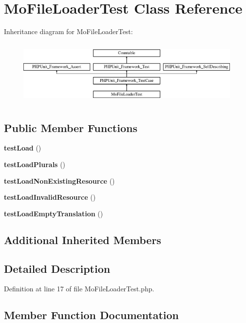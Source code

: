 \section{Mo\+File\+Loader\+Test Class Reference}
\label{class_symfony_1_1_component_1_1_translation_1_1_tests_1_1_loader_1_1_mo_file_loader_test}
Inheritance diagram for Mo\+File\+Loader\+Test\+:\begin{figure}[H]
\begin{center}
\leavevmode
\includegraphics[height=3.303835cm]{class_symfony_1_1_component_1_1_translation_1_1_tests_1_1_loader_1_1_mo_file_loader_test}
\end{center}
\end{figure}
\subsection*{Public Member Functions}
\begin{DoxyCompactItemize}
\item 
{\bf test\+Load} ()
\item 
{\bf test\+Load\+Plurals} ()
\item 
{\bf test\+Load\+Non\+Existing\+Resource} ()
\item 
{\bf test\+Load\+Invalid\+Resource} ()
\item 
{\bf test\+Load\+Empty\+Translation} ()
\end{DoxyCompactItemize}
\subsection*{Additional Inherited Members}


\subsection{Detailed Description}


Definition at line 17 of file Mo\+File\+Loader\+Test.\+php.



\subsection{Member Function Documentation}
